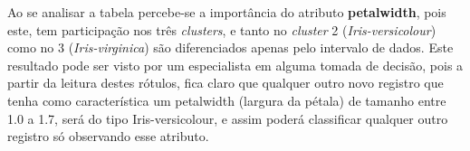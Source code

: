 Ao se analisar a tabela percebe-se a importância do atributo \textbf{petalwidth}, pois este, tem participação nos três \textit{clusters}, e tanto no \textit{cluster} 2 (\textit{Iris-versicolour}) como no 3 (\textit{Iris-virginica}) são diferenciados apenas pelo intervalo de dados. Este resultado pode ser visto por um especialista em alguma tomada de decisão, pois a partir da leitura destes rótulos, fica claro que qualquer  outro novo registro que tenha como característica um petalwidth (largura da pétala) de tamanho entre 1.0 a 1.7, será do tipo Iris-versicolour, e assim poderá classificar qualquer outro registro só observando esse atributo.  



